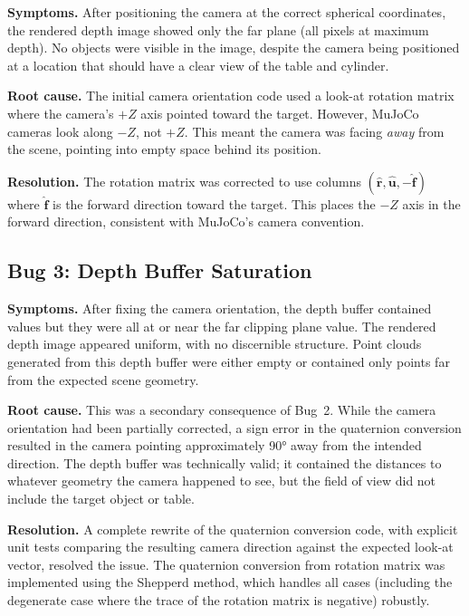 \documentclass[11pt,a4paper]{report}
\begin{document}
\textbf{Symptoms.} After positioning the camera at the correct spherical coordinates, the rendered depth image showed only the far plane (all pixels at maximum depth). No objects were visible in the image, despite the camera being positioned at a location that should have a clear view of the table and cylinder.

\textbf{Root cause.} The initial camera orientation code used a look-at rotation matrix where the camera's $+Z$ axis pointed toward the target. However, MuJoCo cameras look along $-Z$, not $+Z$. This meant the camera was facing \emph{away} from the scene, pointing into empty space behind its position.

\textbf{Resolution.} The rotation matrix was corrected to use columns $(\hat{\mathbf{r}}, \hat{\mathbf{u}}, -\hat{\mathbf{f}})$ where $\hat{\mathbf{f}}$ is the forward direction toward the target. This places the $-Z$ axis in the forward direction, consistent with MuJoCo's camera convention.

\subsection{Bug 3: Depth Buffer Saturation}
\label{sec:bug_depth}

\textbf{Symptoms.} After fixing the camera orientation, the depth buffer contained values but they were all at or near the far clipping plane value. The rendered depth image appeared uniform, with no discernible structure. Point clouds generated from this depth buffer were either empty or contained only points far from the expected scene geometry.

\textbf{Root cause.} This was a secondary consequence of Bug~2. While the camera orientation had been partially corrected, a sign error in the quaternion conversion resulted in the camera pointing approximately 90° away from the intended direction. The depth buffer was technically valid; it contained the distances to whatever geometry the camera happened to see, but the field of view did not include the target object or table.

\textbf{Resolution.} A complete rewrite of the quaternion conversion code, with explicit unit tests comparing the resulting camera direction against the expected look-at vector, resolved the issue. The quaternion conversion from rotation matrix was implemented using the Shepperd method, which handles all cases (including the degenerate case where the trace of the rotation matrix is negative) robustly.
\end{document}
